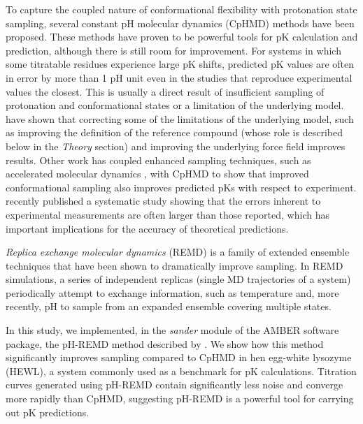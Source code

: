 To capture the coupled nature of conformational flexibility with protonation
state sampling, several constant pH molecular dynamics (CpHMD) methods have been
proposed.  \cite{Baptista1997, Baptista2002, Burgi2002, Lee2004, Borjesson2004,
Mongan2004, Khandogin2005} These methods have proven to be powerful tools for
pK calculation and prediction, although there is still room for
improvement. \cite{Alexov2011}  For systems in which some titratable residues
experience large pK shifts, predicted pK values are often in error
by more than 1 pH unit even in the studies that reproduce experimental values
the closest. \cite{Alexov2011}  This is usually a direct result of insufficient
sampling of protonation and conformational states or a limitation of the
underlying model.  \citeauthor{Machuqueiro2011} have shown that correcting some
of the limitations of the underlying model, such as improving the definition of
the reference compound (whose role is described below in the \emph{Theory}
section) and improving the underlying force field improves results.
\cite{Machuqueiro2011} Other work has coupled enhanced sampling techniques, such
as accelerated molecular dynamics \cite{Hamelberg2004}, with CpHMD to show that
improved conformational sampling also improves predicted pKs with respect
to experiment. \cite{Williams2010} \citeauthor{Webb2011} recently published a
systematic study showing that the errors inherent to experimental measurements
are often larger than those reported, which has important implications for the
accuracy of theoretical predictions. \cite{Webb2011}

\emph{Replica exchange molecular dynamics} (REMD) is a family of extended
ensemble techniques that have been shown to dramatically improve sampling.
\cite{Sugita1999, Pitera2003, Chodera2011, Nadler2008, Meng2010, Meng2011a} In
REMD simulations, a series of independent replicas (single MD trajectories of a
system) periodically attempt to exchange information, such as temperature
\cite{Sugita1999,Pitera2003} and, more recently, pH \cite{Itoh2011,Wallace2011}
to sample from an expanded ensemble covering multiple states.

In this study, we implemented, in the \emph{sander} module of the AMBER
\cite{AMBER12} software package, the pH-REMD method described by
\citeauthor{Itoh2011} \cite{Itoh2011}.  We show how this method significantly
improves sampling compared to CpHMD in hen egg-white lysozyme (HEWL), a system
commonly used as a benchmark for pK calculations.  Titration curves
generated using pH-REMD contain significantly less noise and converge more
rapidly than CpHMD, suggesting pH-REMD is a powerful tool for carrying out
pK predictions.


